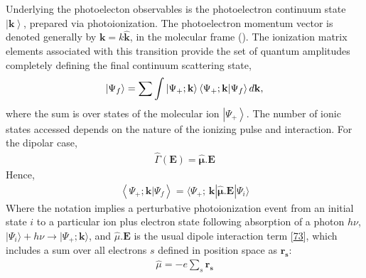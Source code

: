 \documentclass[letterpaper,table,10pt,english]{jupyterBook}
\begin{document}
\sphinxAtStartPar
Underlying the photoelecton observables is the photoelectron continuum state \(\left|\mathbf{k}\right>\), prepared via photoionization. The photoelectron momentum vector is denoted generally by
\(\boldsymbol{\mathbf{k}}=k\mathbf{\hat{k}}\), in the molecular frame ({\hyperref[\detokenize{backmatter/glossary:term-MF}]{}}). The ionization matrix elements associated with this transition provide the set of quantum amplitudes completely defining the final continuum scattering state,
\begin{equation}\label{equation:part1/theory_photoionization_dynamics_140723:eq:continuum-state-vec}
\begin{split}\left|\Psi_f\right> = \sum{\int{\left|\Psi_{+};\bf{k}\right>\left<\Psi_{+};\mathbf{k}|\Psi_f\right> d\bf{k}}},
\end{split}
\end{equation}
\sphinxAtStartPar
where the sum is over states of the molecular ion \(\left|\Psi_{+}\right>\). The number of ionic states accessed depends on the nature of the ionizing pulse and interaction. For the dipolar case,
\begin{equation}\label{equation:part1/theory_photoionization_dynamics_140723:eq:def-dipole-operator}
\begin{split}\hat{\Gamma}(\boldsymbol{\mathbf{E}}) = \hat{\boldsymbol{\mu}}.\boldsymbol{\mathbf{E}}\end{split}
\end{equation}
\sphinxAtStartPar
Hence,
\begin{equation}\label{equation:part1/theory_photoionization_dynamics_140723:eq:matE-dipole}
\begin{split}\left<\Psi_{+};\mathbf{k}|\Psi_f\right> =\langle\Psi_{+};\,\mathbf{k}|\hat{\boldsymbol{\mu}}.\boldsymbol{\mathbf{E}}|\Psi_{i}\rangle
\end{split}
\end{equation}
\sphinxAtStartPar
Where the notation implies a perturbative photoionization event from an initial state \(i\) to a particular ion plus electron state following absorption of a photon \(h\nu\), \(|\Psi_{i}\rangle+h\nu{\rightarrow}|\Psi_{+};\boldsymbol{\mathbf{k}}\rangle\), and \(\hat{\mu}.\boldsymbol{\mathbf{E}}\) is the usual dipole interaction term {[}\hyperlink{cite.backmatter/bibliography:id812}{73}{]}, which includes a sum over all electrons \(s\) defined in position space as \(\mathbf{r_{s}}\):
\begin{equation}\label{equation:part1/theory_photoionization_dynamics_140723:eq:dipole-operator}
\begin{split}\hat{\mu}=-e\sum_{s}\mathbf{r_{s}}
\end{split}
\end{equation}
\end{document}
